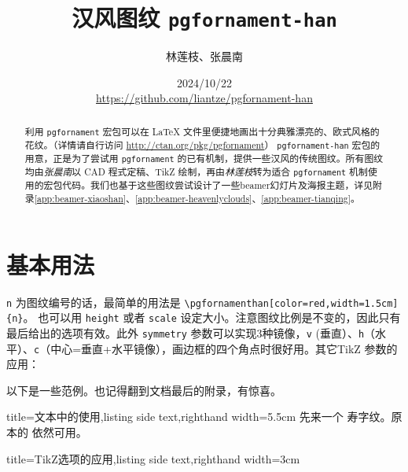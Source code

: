 \documentclass[fontset=fandol]{ctexart}
\title{汉风图纹 \texttt{pgfornament-han}}
\author{林莲枝、张晨南}
\date{2024/10/22\\\url{https://github.com/liantze/pgfornament-han}}
\newcommand{\latexinline}[1]{\lstinline|#1|}
\begin{document}
\maketitle

\begin{abstract}
利用 \texttt{pgfornament} 宏包可以在 \LaTeX{} 文件里便捷地画出十分典雅漂亮的、欧式风格的花纹。（详情请自行访问 \url{http://ctan.org/pkg/pgfornament}）
 \texttt{pgfornament-han} 宏包的用意，正是为了尝试用 \texttt{pgfornament} 的已有机制，提供一些汉风的传统图纹。所有图纹均由\emph{张晨南}以 CAD 程式定稿、TikZ 绘制，再由\emph{林莲枝}转为适合 \texttt{pgfornament} 机制使用的宏包代码。我们也基于这些图纹尝试设计了一些beamer幻灯片及海报主题，详见附录\ref{app:beamer-xiaoshan}、\ref{app:beamer-heavenlyclouds}、\ref{app:beamer-tianqing}。
\end{abstract}

\part{基本用法}

\texttt{n} 为图纹编号的话，最简单的用法是 \latexinline{\pgfornamenthan[color=red,width=1.5cm]{n}}。
也可以用 \texttt{height} 或者 \texttt{scale} 设定大小。注意图纹比例是不变的，因此只有最后给出的选项有效。此外 \texttt{symmetry} 参数可以实现3种镜像，\texttt{v} (垂直）、\texttt{h}（水平）、\texttt{c}（中心=垂直+水平镜像），画边框的四个角点时很好用。其它TikZ 参数的应用：

\begin{latexcode}
\end{latexcode}

以下是一些范例。也记得翻到文档最后的附录，有惊喜。

\bigskip

\begin{tcblisting}{title={文本中的使用},listing side text,righthand width=5.5cm}
先来一个 
寿字纹。原本的  依然可用。
\end{tcblisting}

\enlargethispage{\baselineskip}


\begin{tcblisting}{title={TikZ选项的应用},listing side text,righthand width=3cm}
\end{tcblisting}
\end{document}
